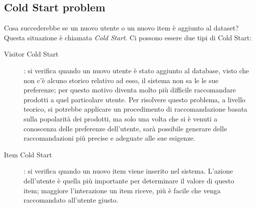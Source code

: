 \subsection{Cold Start problem} 
Cosa succederebbe se un nuovo utente o un nuovo item è aggiunto al dataset? Questa situazione è chiamata \textit{Cold Start}. Ci possono
essere due tipi di Cold Start:
\begin{description}
	\item[Visitor Cold Start]: si verifica quando un nuovo utente è stato aggiunto al database, visto che non c'è alcuno storico relativo ad esso, il sistema non
	sa le le sue preferenze; per questo motivo diventa molto più difficile raccomandare prodotti a quel particolare utente. Per risolvere questo problema,
	a livello teorico, si potrebbe applicare un procedimento di raccomandazione basata sulla popolarità dei prodotti, ma solo una volta che si è venuti a 
	conoscenza delle preferenze dell'utente, sarà possibile generare delle raccomandazioni più precise e adeguate alle sue esigenze.
	\item[Item Cold Start]: si verifica quando un nuovo item viene inserito nel sistema. L'azione dell'utente è quella più importante per determinare
	il valore di questo item; maggiore l'interazione un item riceve, più è facile che venga raccomandato all'utente giusto.  
\end{description}



